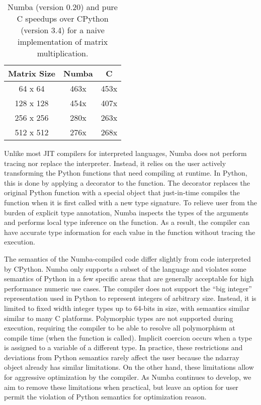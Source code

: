 \documentclass{acm_proc_article-sp}
\begin{document}
\begin{table}
\centering
\label{table:speedup}
\caption{Numba (version 0.20) and pure C speedups over CPython (version 3.4) for a naive implementation of matrix multiplication.}
\begin{tabular}{|c|c|c|} \hline
\textbf{Matrix Size} & \textbf{Numba} & \textbf{C}\\ \hline
64 x 64 & 463x & 453x \\ \hline
128 x 128 & 454x & 407x \\ \hline
256 x 256 & 280x & 263x \\ \hline
512 x 512 & 276x & 268x \\ \hline
\end{tabular}
\end{table}



Unlike most JIT compilers for interpreted languages, Numba does not
perform tracing nor replace the interpreter.  Instead, it relies on
the user actively transforming the Python functions that need
compiling at runtime.  In Python, this is done by applying a decorator
to the function.  The decorator replaces the original Python function
with a special object that just-in-time compiles the function when it
is first called with a new type signature.  To relieve user from the
burden of explicit type annotation, Numba inspects the types of the
arguments and performs local type inference on the function.  As a
result, the compiler can have accurate type information for each value
in the function without tracing the execution.

The semantics of the Numba-compiled code differ slightly from code
interpreted by CPython. Numba only supports a subset of the language
and violates some semantics of Python in a few specific areas that are
generally acceptable for high performance numeric use cases.  The
compiler does not support the ``big integer'' representation used in
Python to represent integers of arbitrary size.  Instead, it is
limited to fixed width integer types up to 64-bits in size, with
semantics similar similar to many C platforms.  Polymorphic types are
not supported during execution, requiring the compiler to be able to
resolve all polymorphism at compile time (when the function is
called).  Implicit coercion occurs when a type is assigned to a
variable of a different type. In practice, these restrictions and
deviations from Python semantics rarely affect the user because the
ndarray object already has similar limitations. On the other hand,
these limitations allow for aggressive optimization by the compiler.
As Numba continues to develop, we aim to remove these limitations when
practical, but leave an option for user permit the violation of Python
semantics for optimization reason.
\end{document}
